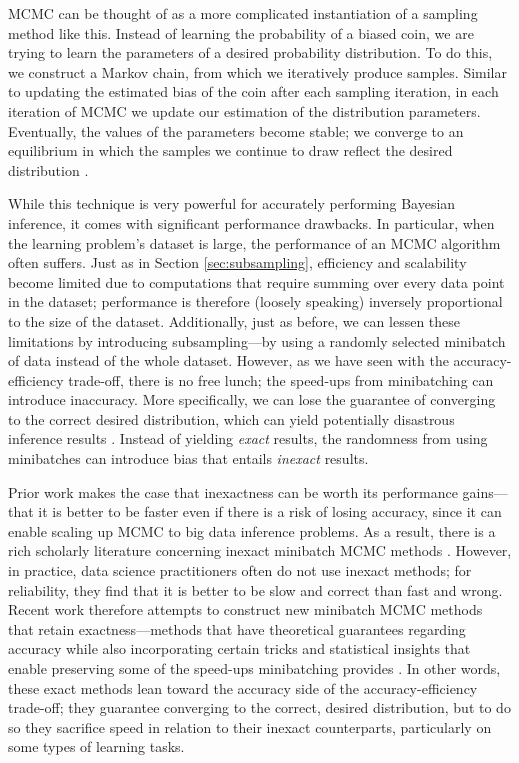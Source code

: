 \documentclass[sigplan,screen]{acmart}
\begin{document}
MCMC can be thought of as a more complicated instantiation of a sampling method like this. Instead of learning the probability of a biased coin, we are trying to learn the parameters of a desired probability distribution. To do this, we construct a Markov chain, from which we iteratively produce samples. Similar to updating the estimated bias of the coin after each sampling iteration, in each iteration of MCMC we update our estimation of the distribution parameters. Eventually, the values of the parameters become stable; we converge to an equilibrium in which the samples we continue to draw reflect the desired distribution \cite{brooks2011handbook}.

While this technique is very powerful for accurately performing Bayesian inference, it comes with significant performance drawbacks. In particular, when the learning problem's dataset is large, the performance of an MCMC algorithm often suffers. Just as in Section \ref{sec:subsampling}, efficiency and scalability become limited due to computations that require summing over every data point in the dataset; performance is therefore (loosely speaking) inversely proportional to the size of the dataset. Additionally, just as before, we can lessen these limitations by introducing subsampling---by using a randomly selected minibatch of data instead of the whole dataset. However, as we have seen with the accuracy-efficiency trade-off, there is no free lunch; the speed-ups from minibatching can introduce inaccuracy. More specifically, we can lose the guarantee of converging to the correct desired distribution, which can yield potentially disastrous inference results \cite{zhang2020tunamh}. Instead of yielding \emph{exact} results, the randomness from using minibatches can introduce bias that entails \emph{inexact} results.

Prior work makes the case that inexactness can be worth its performance gains---that it is better to be faster even if there is a risk of losing accuracy, since it can enable scaling up MCMC to big data inference problems. As a result, there is a rich scholarly literature concerning inexact minibatch MCMC methods  \cite{chen2014stochastic,korattikara2014austerity, seita2016efficient}. However, in practice, data science practitioners often do not use inexact methods; for reliability, they find that it is better to be slow and correct than fast and wrong. Recent work therefore attempts to construct new minibatch MCMC methods that retain exactness---methods that have theoretical guarantees regarding accuracy while also incorporating certain tricks and statistical insights that enable preserving some of the speed-ups minibatching provides \cite{maclaurin2015firefly, zhang2019poisson, zhang2020amagold, cornish2019scalable, zhang2020tunamh}. In other words, these exact methods lean toward the accuracy side of the accuracy-efficiency trade-off; they guarantee converging to the correct, desired distribution, but to do so they sacrifice speed in relation to their inexact counterparts, particularly on some types of learning tasks.
\end{document}
